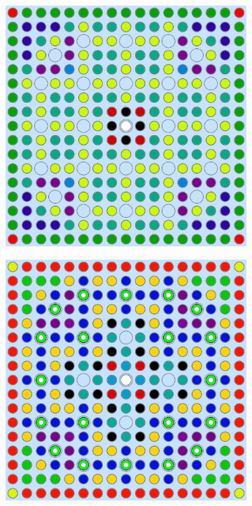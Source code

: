 \begin{figure}[h!]
\centering
\begin{subfigure}{.45\textwidth}
  \centering
  \includegraphics[width=0.9\linewidth]{figures/patterns/lns/assm-31/materials}
  \caption{}
  \label{fig:chap9-assm-31-lns-materials}
\end{subfigure}%
\begin{subfigure}{.45\textwidth}
  \centering
  \includegraphics[width=0.9\linewidth]{figures/patterns/lns/assm-31-20BPs/materials}

\end{subfigure}
\end{figure}
